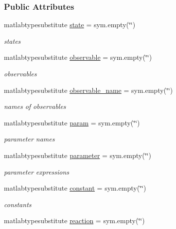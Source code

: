 \subsubsection*{Public Attributes}
\begin{DoxyCompactItemize}
\item 
matlabtypesubstitute \hyperlink{class_s_b_m_lode_adc6e5733fc3c22f0a7b2914188c49c90}{state} = sym.\+empty(\char`\"{}\char`\"{})
\begin{DoxyCompactList}\small\item\em states \end{DoxyCompactList}\item 
matlabtypesubstitute \hyperlink{class_s_b_m_lode_a072b6f6192ac4f40e74b69f901ecdfef}{observable} = sym.\+empty(\char`\"{}\char`\"{})
\begin{DoxyCompactList}\small\item\em observables \end{DoxyCompactList}\item 
matlabtypesubstitute \hyperlink{class_s_b_m_lode_a6e638e3379dc2d099b3cf3083246fbe0}{observable\+\_\+name} = sym.\+empty(\char`\"{}\char`\"{})
\begin{DoxyCompactList}\small\item\em names of observables \end{DoxyCompactList}\item 
matlabtypesubstitute \hyperlink{class_s_b_m_lode_a51f20d6b1b54a2eee3be0e8adc96a0ae}{param} = sym.\+empty(\char`\"{}\char`\"{})
\begin{DoxyCompactList}\small\item\em parameter names \end{DoxyCompactList}\item 
matlabtypesubstitute \hyperlink{class_s_b_m_lode_a0d71b5c1dcca8d3fee88d6a11d3e2071}{parameter} = sym.\+empty(\char`\"{}\char`\"{})
\begin{DoxyCompactList}\small\item\em parameter expressions \end{DoxyCompactList}\item 
matlabtypesubstitute \hyperlink{class_s_b_m_lode_a391f14c28a859734cd091e4e521bb8f8}{constant} = sym.\+empty(\char`\"{}\char`\"{})
\begin{DoxyCompactList}\small\item\em constants \end{DoxyCompactList}\item 
matlabtypesubstitute \hyperlink{class_s_b_m_lode_ab342dbdf93b408b2c4bc416ea1701178}{reaction} = sym.\+empty(\char`\"{}\char`\"{})

\end{DoxyCompactItemize}
